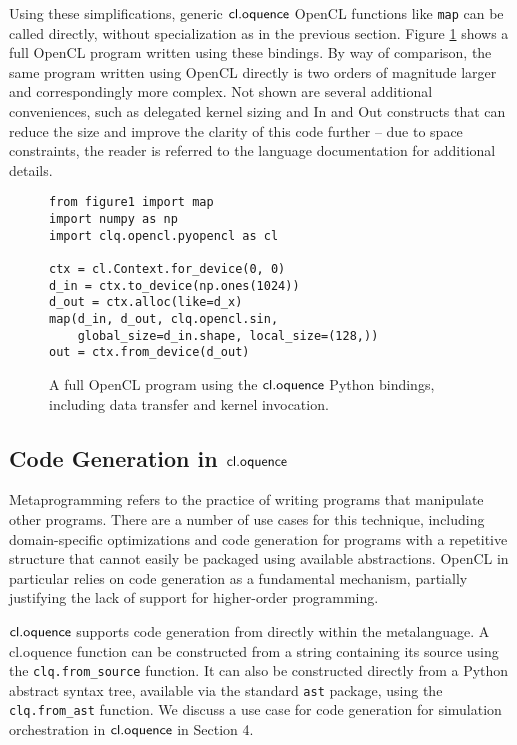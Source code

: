 \documentclass[10pt, conference, compsocconf]{IEEEtran}
\begin{document}
Using these simplifications, generic $\textsf{cl.oquence}$ OpenCL functions like \verb|map| can be called directly, without specialization as in the previous section. Figure \ref{py} shows a full OpenCL program written using these bindings. By way of comparison, the same program written using OpenCL directly is two orders of magnitude larger and correspondingly more complex. Not shown are several additional conveniences, such as delegated kernel sizing and In and Out constructs that can reduce the size and improve the clarity of this code further -- due to space constraints, the reader is referred to the language documentation for additional details.

\begin{figure}
\small{\begin{verbatim}
from figure1 import map
import numpy as np
import clq.opencl.pyopencl as cl

ctx = cl.Context.for_device(0, 0)
d_in = ctx.to_device(np.ones(1024))
d_out = ctx.alloc(like=d_x)
map(d_in, d_out, clq.opencl.sin, 
    global_size=d_in.shape, local_size=(128,))
out = ctx.from_device(d_out)
\end{verbatim}}
\caption{A full OpenCL program using the $\textsf{cl.oquence}$ Python bindings, including data transfer and kernel invocation.}
\label{py}
\end{figure}

\subsection{Code Generation in $\textsf{cl.oquence}$}
Metaprogramming refers to the practice of writing programs that manipulate other programs. There are a number of use cases for this technique, including domain-specific optimizations and code generation for programs with a repetitive structure that cannot easily be packaged using available abstractions. OpenCL in particular relies on code generation as a fundamental mechanism, partially justifying the lack of support for higher-order programming.

$\textsf{cl.oquence}$ supports code generation from directly within the metalanguage. A cl.oquence function can be constructed from a string containing its source using the \verb|clq.from_source| function. It can also be constructed directly from a Python abstract syntax tree, available via the standard \verb|ast| package, using the \verb|clq.from_ast| function. We discuss a use case for code generation for simulation orchestration in $\textsf{cl.oquence}$ in Section 4.
\end{document}
